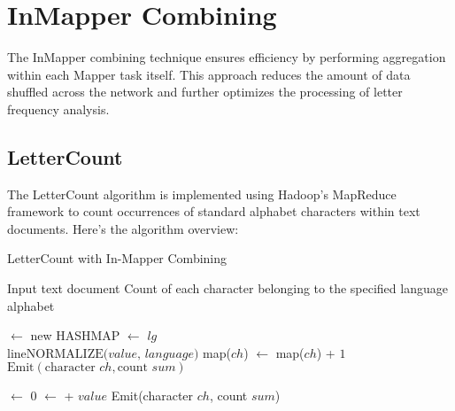 \newpage



\section{InMapper Combining}
The InMapper combining technique ensures efficiency by performing aggregation within each Mapper task itself. This approach reduces the amount of data shuffled across the network and further optimizes the processing of letter frequency analysis.


\subsection{LetterCount}

The LetterCount algorithm is implemented using Hadoop's MapReduce framework to count occurrences of standard alphabet characters within text documents. Here’s the algorithm overview:

\begin{algorithm}
    \caption{LetterCount with In-Mapper Combining}
    
    \begin{algorithmic}[1]
        \Require Input text document
        \Ensure Count of each character belonging to the specified language alphabet

        \Statex
                \State {} $\gets$ new HASHMAP 
                \State {} $\gets$ $lg$ 
            \EndMethod
            \\

                \State $\text{line} $\gets$ \text{NORMALIZE($value$, $language$)}$ 
                    \State map($ch$) $\gets$ map($ch$) + $1$
                \EndFor
            \EndMethod
            \\

                    \State $\text{Emit}(\text{character $ch$}, \text{count $sum$})$ 
                \EndFor
            \EndMethod
        \EndClass

        \Statex
                \State {} $\gets$ $0$ 
                    \State {} $\gets$  + $value$ 
                \EndFor
                \State Emit(character $ch$, count $sum$) 
            \EndMethod
        \EndClass
    \end{algorithmic}
\end{algorithm}

